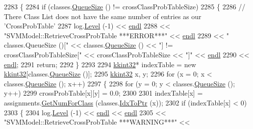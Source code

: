 \begin{DoxyCode}
2283 \{
2284   \textcolor{keywordflow}{if}  (classes.\hyperlink{class_k_k_b_1_1_k_k_queue_a1dab601f75ee6a65d97f02bddf71c40d}{QueueSize} () != crossClassProbTableSize)
2285   \{
2286     \textcolor{comment}{// There Class List does not have the same number of entries as our 'CrossProbTable'}
2287     log.\hyperlink{class_k_k_b_1_1_run_log_a32cf761d7f2e747465fd80533fdbb659}{Level} (-1) << \hyperlink{namespace_k_k_b_ad1f50f65af6adc8fa9e6f62d007818a8}{endl}
2288                    << \textcolor{stringliteral}{"SVMModel::RetrieveCrossProbTable    ***ERROR***"} << \hyperlink{namespace_k_k_b_ad1f50f65af6adc8fa9e6f62d007818a8}{endl}
2289                    << \textcolor{stringliteral}{"            classes.QueueSize ()["} << classes.\hyperlink{class_k_k_b_1_1_k_k_queue_a1dab601f75ee6a65d97f02bddf71c40d}{QueueSize} () << \textcolor{stringliteral}{"] !=
       crossClassProbTableSize["} << crossClassProbTableSize << \textcolor{stringliteral}{"]"} << \hyperlink{namespace_k_k_b_ad1f50f65af6adc8fa9e6f62d007818a8}{endl}
2290                    << \hyperlink{namespace_k_k_b_ad1f50f65af6adc8fa9e6f62d007818a8}{endl};
2291     \textcolor{keywordflow}{return};
2292   \}
2293 
2294   \hyperlink{namespace_k_k_b_a8fa4952cc84fda1de4bec1fbdd8d5b1b}{kkint32}*  indexTable = \textcolor{keyword}{new} \hyperlink{namespace_k_k_b_a8fa4952cc84fda1de4bec1fbdd8d5b1b}{kkint32}[classes.\hyperlink{class_k_k_b_1_1_k_k_queue_a1dab601f75ee6a65d97f02bddf71c40d}{QueueSize} ()];
2295   \hyperlink{namespace_k_k_b_a8fa4952cc84fda1de4bec1fbdd8d5b1b}{kkint32}  x, y;
2296   \textcolor{keywordflow}{for}  (x = 0;  x < classes.\hyperlink{class_k_k_b_1_1_k_k_queue_a1dab601f75ee6a65d97f02bddf71c40d}{QueueSize} ();  x++)
2297   \{
2298     \textcolor{keywordflow}{for}  (y = 0;  y < classes.\hyperlink{class_k_k_b_1_1_k_k_queue_a1dab601f75ee6a65d97f02bddf71c40d}{QueueSize} ();  y++)
2299        crossProbTable[x][y] = 0.0;
2300 
2301     indexTable[x] = assignments.\hyperlink{class_k_k_m_l_l_1_1_class_assignments_a16bde30c19763d38ebcf9c33f0accd5f}{GetNumForClass} (classes.\hyperlink{class_k_k_b_1_1_k_k_queue_acce2bdd8b3327e38266cf198382cd852}{IdxToPtr} (x));
2302     \textcolor{keywordflow}{if}  (indexTable[x] < 0)
2303     \{
2304       log.\hyperlink{class_k_k_b_1_1_run_log_a32cf761d7f2e747465fd80533fdbb659}{Level} (-1) << \hyperlink{namespace_k_k_b_ad1f50f65af6adc8fa9e6f62d007818a8}{endl} << \hyperlink{namespace_k_k_b_ad1f50f65af6adc8fa9e6f62d007818a8}{endl}
2305                      << \textcolor{stringliteral}{"SVMModel::RetrieveCrossProbTable      ***WARNING***"} << 

\end{DoxyCode}
